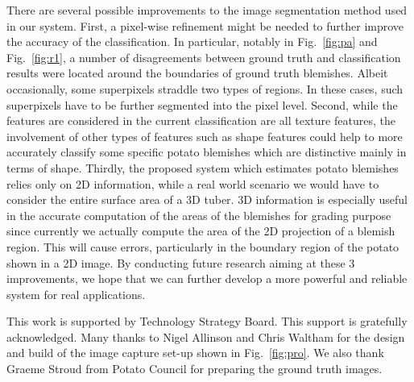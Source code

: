 \documentclass[twocolumn]{svjour3}          %
\begin{document}
There are several possible improvements to the image segmentation method used in our system. First, a pixel-wise refinement might be needed to further improve the accuracy of the classification. In particular, notably in Fig.~\ref{fig:pa} and Fig.~\ref{fig:r1}, a number of disagreements between ground truth and classification results were located around the boundaries of ground truth blemishes. Albeit occasionally, some superpixels straddle two types of regions. In these cases, such superpixels have to be further segmented into the pixel level. Second, while the features are considered in the current classification are all texture features, the involvement of other types of features such as shape features could help to more accurately classify some specific potato blemishes which are distinctive mainly in terms of shape. Thirdly, the proposed system which estimates potato blemishes relies only on 2D information, while a real world scenario we would have to consider the entire surface area of a 3D tuber. 3D information is especially useful in the accurate computation of the areas of the blemishes for grading purpose since currently we actually compute the area of the 2D projection of a blemish region. This will cause errors, particularly in the boundary region of the potato shown in a 2D image. By conducting future research aiming at these 3 improvements, we hope that we can further develop a more powerful and reliable system for real applications.


\begin{acknowledgements}
This work is supported by Technology Strategy Board. This support is gratefully acknowledged. Many thanks to Nigel Allinson and Chris Waltham for the design and build of the image capture set-up shown in Fig.~\ref{fig:pro}. We also thank Graeme Stroud from Potato Council for preparing the ground truth images.
\end{acknowledgements}

\end{document}
